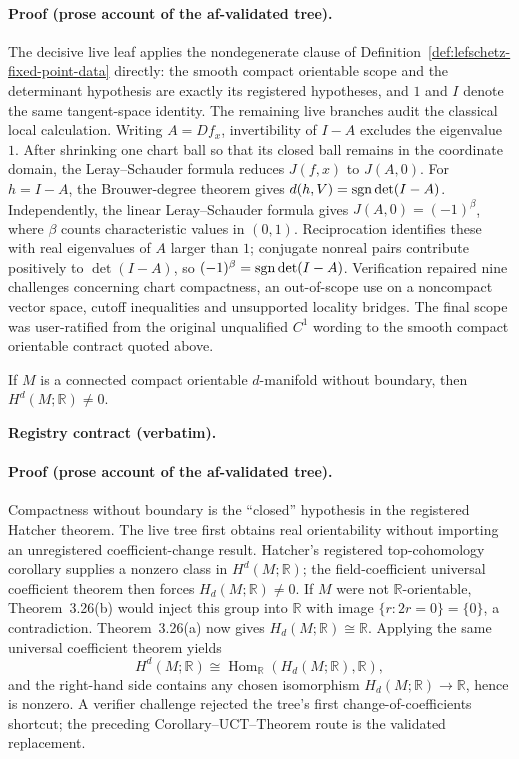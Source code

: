\paragraph{Proof (prose account of the af-validated tree).}
The decisive live leaf applies the nondegenerate clause of
Definition~\ref{def:lefschetz-fixed-point-data} directly: the smooth compact orientable
scope and the determinant hypothesis are exactly its registered hypotheses, and $1$
and $I$ denote the same tangent-space identity.  The remaining live branches audit the
classical local calculation.  Writing $A=Df_x$, invertibility of $I-A$ excludes the
eigenvalue $1$.  After shrinking one chart ball so that its closed ball remains in the
coordinate domain, the Leray--Schauder formula reduces $J(f,x)$ to $J(A,0)$.
For $h=I-A$, the Brouwer-degree theorem gives
$d(h,V)=\operatorname{sgn}\det(I-A)$.  Independently, the linear Leray--Schauder formula gives
$J(A,0)=(-1)^\beta$, where $\beta$ counts characteristic values in $(0,1)$.
Reciprocation identifies these with real eigenvalues of $A$ larger than $1$;
conjugate nonreal pairs contribute positively to $\det(I-A)$, so
$(-1)^\beta=\operatorname{sgn}\det(I-A)$.  Verification repaired nine challenges concerning chart
compactness, an out-of-scope use on a noncompact vector space, cutoff inequalities and
unsupported locality bridges.  The final scope was user-ratified from the original
unqualified $C^1$ wording to the smooth compact orientable contract quoted above.

\begin{lemma}\label{lem:topology-orientable-top-cohomology}
If $M$ is a connected compact orientable $d$-manifold without boundary, then
$H^d(M;\mathbb R)\ne0$.
\end{lemma}

\noindent\textbf{Registry contract (verbatim).}

\paragraph{Proof (prose account of the af-validated tree).}
Compactness without boundary is the ``closed'' hypothesis in the registered Hatcher
theorem.  The live tree first obtains real orientability without importing an
unregistered coefficient-change result.  Hatcher's registered top-cohomology
corollary supplies a nonzero class in $H^d(M;\mathbb R)$; the field-coefficient
universal coefficient theorem then forces $H_d(M;\mathbb R)\ne0$.  If $M$ were not
$\mathbb R$-orientable, Theorem~3.26(b) would inject this group into $\mathbb R$ with
image $\{r:2r=0\}=\{0\}$, a contradiction.  Theorem~3.26(a) now gives
$H_d(M;\mathbb R)\cong\mathbb R$.  Applying the same universal coefficient theorem
yields
\[
  H^d(M;\mathbb R)\cong
  \operatorname{Hom}_{\mathbb R}(H_d(M;\mathbb R),\mathbb R),
\]
and the right-hand side contains any chosen isomorphism
$H_d(M;\mathbb R)\to\mathbb R$, hence is nonzero.  A verifier challenge rejected the
tree's first change-of-coefficients shortcut; the preceding Corollary--UCT--Theorem
route is the validated replacement.

